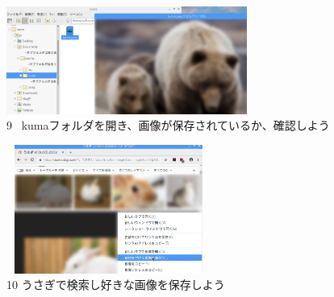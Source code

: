 \documentclass[a4paper,12pt]{jarticle}
\begin{document}
\begin{figure}[t]
  \begin{minipage}{\textwidth}
    \begin{minipage}{7.882cm}
      \includegraphics[width=7.872cm,height=3.54cm]{textbook-img102.png}\\
      9 \ kumaフォルダを開き、画像が保存されているか、確認しよう
    \end{minipage}
    \begin{minipage}{2.582cm}
    \end{minipage}
    \begin{minipage}{6.582cm}
      \includegraphics[width=6.71cm,height=4.228cm]{textbook-img101.png}\\
      10 うさぎで検索し好きな画像を保存しよう
    \end{minipage}
  \end{minipage}

  \vspace{60mm}

\end{figure}



\bigskip



\clearpage
\end{document}
